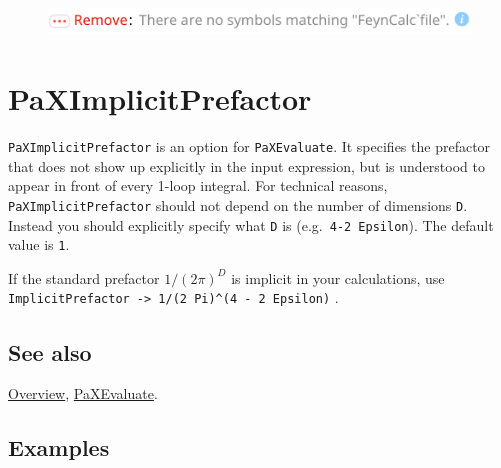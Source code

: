 \documentclass[../FeynHelpersManual.tex]{subfiles}
\begin{document}
\FloatBarrier
\begin{figure}[!ht]
\centering
\includegraphics[width=0.6\linewidth]{img/1ne6vpix78l6i.pdf}
\end{figure}
\FloatBarrier

\begin{Shaded}
\begin{Highlighting}[]
 
\end{Highlighting}
\end{Shaded}

\hypertarget{paximplicitprefactor}{
\section{PaXImplicitPrefactor}\label{paximplicitprefactor}}

\texttt{PaXImplicitPrefactor} is an option for \texttt{PaXEvaluate}. It
specifies the prefactor that does not show up explicitly in the input
expression, but is understood to appear in front of every 1-loop
integral. For technical reasons, \texttt{PaXImplicitPrefactor} should
not depend on the number of dimensions \texttt{D}. Instead you should
explicitly specify what \texttt{D} is (e.g.~\texttt{4-2 Epsilon}). The
default value is \texttt{1}.

If the standard prefactor \(1/(2 \pi)^D\) is implicit in your
calculations, use \texttt{ImplicitPrefactor -> 1/(2 Pi)^(4 - 2 Epsilon)}
.

\subsection{See also}

\hyperlink{toc}{Overview}, \hyperlink{paxevaluate}{PaXEvaluate}.

\subsection{Examples}
\end{document}
